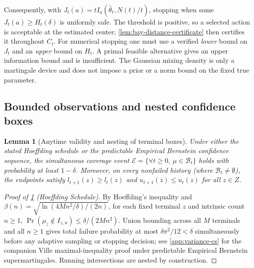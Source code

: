 \documentclass{article}
\theoremstyle{plain}
\newtheorem{lemma}[theorem]{Lemma}
\theoremstyle{definition}
\begin{document}
Consequently, with
$J_t(a)=tI_a(\widehat\theta_t,N(t)/t)$, stopping when some
$J_t(a)\ge H_t(\delta)$ is uniformly safe.  The threshold is positive,
so a selected action is acceptable at the estimated center;
\cref{lem:bay-distance-certificate} then certifies it throughout $C_t$.
For numerical stopping one must use a verified \emph{lower} bound on
$J_t$ and an \emph{upper} bound on $H_t$.  A primal feasible alternative
gives an upper information bound and is insufficient.  The Gaussian
mixing density is only a martingale device and does not impose a prior
or a norm bound on the fixed true parameter.

\subsection{Bounded observations and nested confidence boxes}
\label{app:bounded-boxes}

\begin{lemma}[Anytime validity and nesting of terminal boxes]
\label{lem:nested-interval-valid}
Under either the stated Hoeffding schedule or the predictable Empirical Bernstein confidence sequence, the simultaneous coverage event $\mathcal E=\{\forall t\ge 0,\ \mu\in\mathcal B_t\}$ holds with probability at least $1-\delta$. Moreover, on every nonfailed history (where $\mathcal B_t\ne\emptyset$), the endpoints satisfy $l_{t+1}(z)\ge l_t(z)$ and $u_{t+1}(z)\le u_t(z)$ for all $z\in Z$.
\end{lemma}

\begin{proof}[Proof of \cref{lem:nested-interval-valid} (Hoeffding Schedule)]
By Hoeffding's inequality and $\beta(n)=\sqrt{\ln(4Mn^2/\delta)/(2n)}$, for each fixed terminal $z$ and intrinsic count $n\ge 1$, $\Pr(\mu_z\notin I_{z,n})\le \delta/(2Mn^2)$. Union bounding across all $M$ terminals and all $n\ge 1$ gives total failure probability at most $\delta\pi^2/12<\delta$ simultaneously before any adaptive sampling or stopping decision; see \cref{app:variance-cs} for the companion Ville maximal-inequality proof under predictable Empirical Bernstein supermartingales. Running intersections are nested by construction.
\end{proof}
\end{document}
